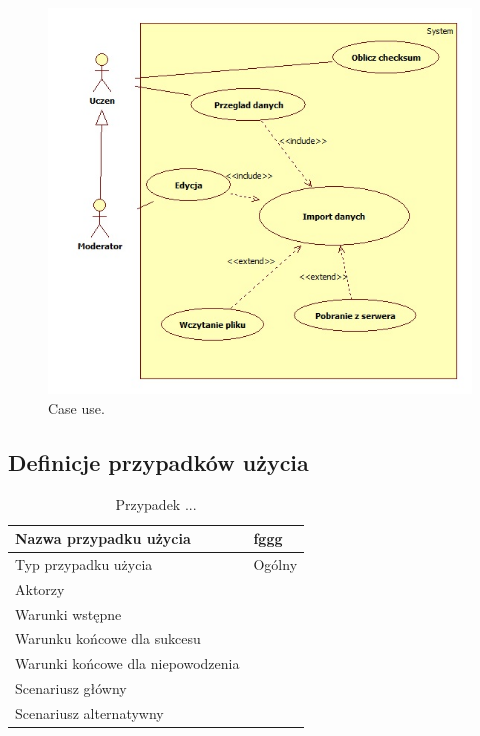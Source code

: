\label{sec:diagramcaseuse}
\begin{figure}[H]
  \centering
    \includegraphics[width=\textwidth]{ge/caseuse.jpg}
  \caption{Case use.}
  \label{fig:caseuse}
\end{figure}

\subsection{Definicje przypadków użycia}
\label{sec:defCaseuse}

\begin{table}[H]
    \centering
    \begin{tabular}{|l|l|}
    \hline
    Nazwa przypadku użycia & fggg  \\ \hline
    Typ przypadku użycia  & Ogólny  \\ \hline
    Aktorzy   & ~     \\ \hline
    Warunki wstępne   & ~     \\ \hline
    Warunku końcowe dla sukcesu   & ~     \\ \hline
    Warunki końcowe dla niepowodzenia   & ~     \\ \hline
    Scenariusz główny   & ~     \\ \hline
    Scenariusz alternatywny   & ~     \\ \hline
    \end{tabular}
    \caption{Przypadek ...}
    \label{tab:caseuse1}
\end{table}

